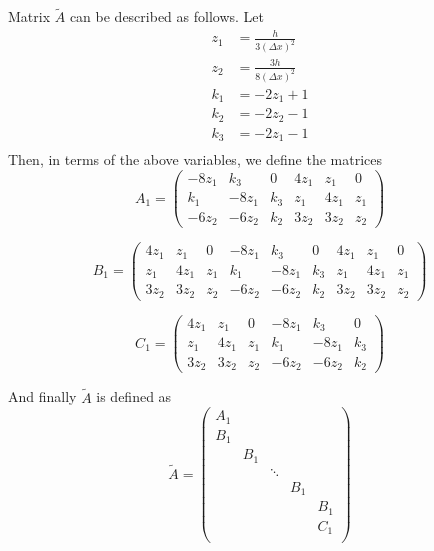 \documentclass[00main.tex]{subfiles}
\begin{document}
Matrix $\tilde{A}$ can be described as follows. Let \begin{align*}
z_1 &= \frac{h}{3(\Delta x)^2}\\
z_2 &= \frac{3h}{8(\Delta x)^2}\\
k_1 &= -2 z_1 + 1\\
k_2 &= -2 z_2 -1\\
k_3 &= -2 z_1-1\\
\end{align*} Then, in terms of the above variables, we define the matrices \[ A_1 = \left( \begin{array}{cccccc}
-8z_1 & k_3 & 0 & 4z_1 & z_1 & 0\\
k_1 & -8z_1 & k_3 & z_1 & 4z_1 & z_1 \\
-6z_2 & -6z_2 & k_2 & 3z_2 & 3z_2 & z_2
\end{array} \right) \]

\[ B_1 = \left( \begin{array}{ccccccccc}
4z_1 & z_1 & 0 & -8z_1 & k_3 & 0 & 4z_1 & z_1 & 0\\
z_1 & 4z_1 & z_1 &k_1 & -8z_1 & k_3 & z_1 & 4z_1 & z_1\\
3z_2 & 3z_2 & z_2 & -6z_2 & -6z_2 & k_2 & 3z_2 & 3z_2 & z_2
\end{array} \right) \]

\[ C_1 = \left( \begin{array}{cccccc}
4z_1 & z_1 & 0 & -8z_1 & k_3 & 0\\
z_1 & 4z_1 & z_1 & k_1 & -8z_1 & k_3\\
3z_2 & 3z_2 & z_2 & -6z_2 & -6z_2 & k_2
\end{array} \right) \]

And finally $\tilde{A}$ is defined as \[ \tilde{A} = \left( \begin{array}{ccccc}
A_1 &&&&\\
B_1 &&&&\\
& B_1 &&&\\
&& \ddots &&\\
&&& B_1 &\\
&&&& B_1 \\
&&&& C_1\\
\end{array} \right) \]

\end{document}
